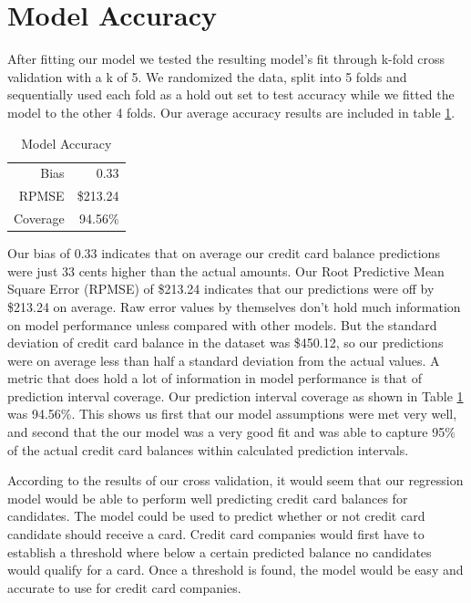 \documentclass{article}
\begin{document}
\section{Model Accuracy}
After fitting our model we tested the resulting model's fit through k-fold cross validation with a k of 5. We randomized the data, split into 5 folds and sequentially used each fold as a hold out set to test accuracy while we fitted the model to the other 4 folds. Our average accuracy results are included in table \ref{acc}.

\vspace{10 pt}
\begin{table}[ht]
\centering
\begin{tabular}{rr}
  \hline
  Bias &  0.33 \\ 
  RPMSE & \$213.24 \\ 
  Coverage & 94.56\% \\ 
   \hline
\end{tabular}
\caption{Model Accuracy} 
\label{acc}
\end{table}
\vspace{7 pt}

Our bias of 0.33 indicates that on average our credit card balance predictions were just 33 cents higher than the actual amounts. Our Root Predictive Mean Square Error (RPMSE) of \$213.24 indicates that our predictions were off by \$213.24 on average. Raw error values by themselves don't hold much information on model performance unless compared with other models. But the standard deviation of credit card balance in the dataset was \$450.12, so our predictions were on average less than half a standard deviation from the actual values. A metric that does hold a lot of information in model performance is that of prediction interval coverage. Our prediction interval coverage as shown in Table \ref{acc} was 94.56\%. This shows us first that our model assumptions were met very well, and second that the our model was a very good fit and was able to capture 95\% of the actual credit card balances within calculated prediction intervals.

According to the results of our cross validation, it would seem that our regression model would be able to perform well predicting credit card balances for candidates. The model could be used to predict whether or not credit card candidate should receive a card. Credit card companies would first have to establish a threshold where below a certain predicted balance no candidates would qualify for a card. Once a threshold is found, the model would be easy and accurate to use for credit card companies.
\end{document}
